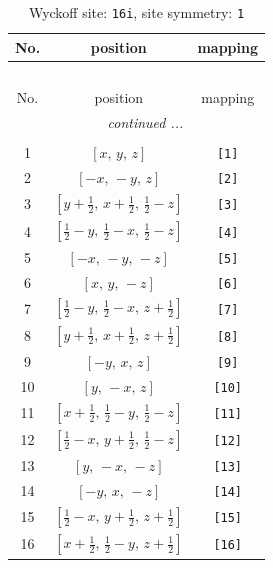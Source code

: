 \documentclass[fleqn,8pt]{jsarticle}
\begin{document}
\begin{longtable}{ccc}
\caption{Wyckoff site: {\tt 16i}, site symmetry: {\tt 1}}
 \\
 \hline \hline
No. & position & mapping \\ \hline \endfirsthead

\multicolumn{2}{l}{\tablename\ \thetable{}} \\
 \hline \hline
No. & position & mapping \\ \hline \endhead

 \hline \hline
\multicolumn{2}{r}{\footnotesize\it continued ...} \\ \endfoot

 \hline \hline
\multicolumn{2}{r}{} \\ \endlastfoot

1 & $\left[ x,\, y,\, z \right]$ & {\tt [1]} \\ \hline
2 & $\left[ - x,\, - y,\, z \right]$ & {\tt [2]} \\ \hline
3 & $\left[ y + \frac{1}{2},\, x + \frac{1}{2},\, \frac{1}{2} - z \right]$ & {\tt [3]} \\ \hline
4 & $\left[ \frac{1}{2} - y,\, \frac{1}{2} - x,\, \frac{1}{2} - z \right]$ & {\tt [4]} \\ \hline
5 & $\left[ - x,\, - y,\, - z \right]$ & {\tt [5]} \\ \hline
6 & $\left[ x,\, y,\, - z \right]$ & {\tt [6]} \\ \hline
7 & $\left[ \frac{1}{2} - y,\, \frac{1}{2} - x,\, z + \frac{1}{2} \right]$ & {\tt [7]} \\ \hline
8 & $\left[ y + \frac{1}{2},\, x + \frac{1}{2},\, z + \frac{1}{2} \right]$ & {\tt [8]} \\ \hline
9 & $\left[ - y,\, x,\, z \right]$ & {\tt [9]} \\ \hline
10 & $\left[ y,\, - x,\, z \right]$ & {\tt [10]} \\ \hline
11 & $\left[ x + \frac{1}{2},\, \frac{1}{2} - y,\, \frac{1}{2} - z \right]$ & {\tt [11]} \\ \hline
12 & $\left[ \frac{1}{2} - x,\, y + \frac{1}{2},\, \frac{1}{2} - z \right]$ & {\tt [12]} \\ \hline
13 & $\left[ y,\, - x,\, - z \right]$ & {\tt [13]} \\ \hline
14 & $\left[ - y,\, x,\, - z \right]$ & {\tt [14]} \\ \hline
15 & $\left[ \frac{1}{2} - x,\, y + \frac{1}{2},\, z + \frac{1}{2} \right]$ & {\tt [15]} \\ \hline
16 & $\left[ x + \frac{1}{2},\, \frac{1}{2} - y,\, z + \frac{1}{2} \right]$ & {\tt [16]} \\
\end{longtable}
\end{document}
